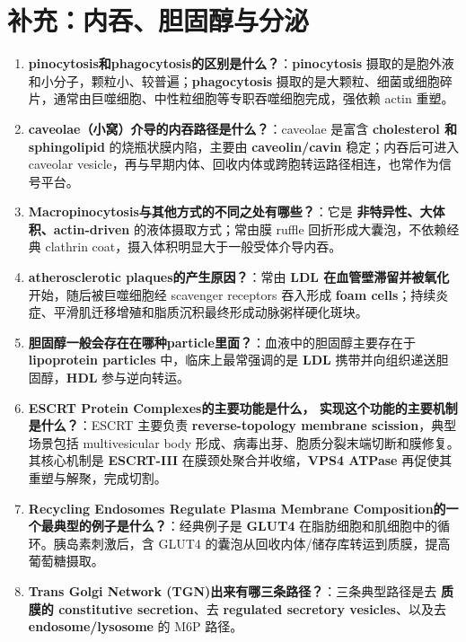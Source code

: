 \documentclass[12pt,fontset=none]{ctexart}
\begin{document}
\section*{补充：内吞、胆固醇与分泌}
\begin{enumerate}
\item \textbf{pinocytosis和phagocytosis的区别是什么？}：\textbf{pinocytosis} 摄取的是胞外液和小分子，颗粒小、较普遍；\textbf{phagocytosis} 摄取的是大颗粒、细菌或细胞碎片，通常由巨噬细胞、中性粒细胞等专职吞噬细胞完成，强依赖 actin 重塑。

\item \textbf{caveolae（小窝）介导的内吞路径是什么？}：caveolae 是富含 \textbf{cholesterol 和 sphingolipid} 的烧瓶状膜内陷，主要由 \textbf{caveolin/cavin} 稳定；内吞后可进入 caveolar vesicle，再与早期内体、回收内体或跨胞转运路径相连，也常作为信号平台。

\item \textbf{Macropinocytosis与其他方式的不同之处有哪些？}：它是 \textbf{非特异性、大体积、actin-driven} 的液体摄取方式；常由膜 ruffle 回折形成大囊泡，不依赖经典 clathrin coat，摄入体积明显大于一般受体介导内吞。

\item \textbf{atherosclerotic plaques的产生原因？}：常由 \textbf{LDL 在血管壁滞留并被氧化} 开始，随后被巨噬细胞经 scavenger receptors 吞入形成 \textbf{foam cells}；持续炎症、平滑肌迁移增殖和脂质沉积最终形成动脉粥样硬化斑块。

\item \textbf{胆固醇一般会存在在哪种particle里面？}：血液中的胆固醇主要存在于 \textbf{lipoprotein particles} 中，临床上最常强调的是 \textbf{LDL} 携带并向组织递送胆固醇，\textbf{HDL} 参与逆向转运。

\item \textbf{ESCRT Protein Complexes的主要功能是什么， 实现这个功能的主要机制是什么？}：ESCRT 主要负责 \textbf{reverse-topology membrane scission}，典型场景包括 multivesicular body 形成、病毒出芽、胞质分裂末端切断和膜修复。其核心机制是 \textbf{ESCRT-III} 在膜颈处聚合并收缩，\textbf{VPS4 ATPase} 再促使其重塑与解聚，完成切割。

\item \textbf{Recycling Endosomes Regulate Plasma Membrane Composition的一个最典型的例子是什么？}：经典例子是 \textbf{GLUT4} 在脂肪细胞和肌细胞中的循环。胰岛素刺激后，含 GLUT4 的囊泡从回收内体/储存库转运到质膜，提高葡萄糖摄取。

\item \textbf{Trans Golgi Network (TGN)出来有哪三条路径？}：三条典型路径是去 \textbf{质膜的 constitutive secretion}、去 \textbf{regulated secretory vesicles}、以及去 \textbf{endosome/lysosome} 的 M6P 路径。


\end{enumerate}
\end{document}
